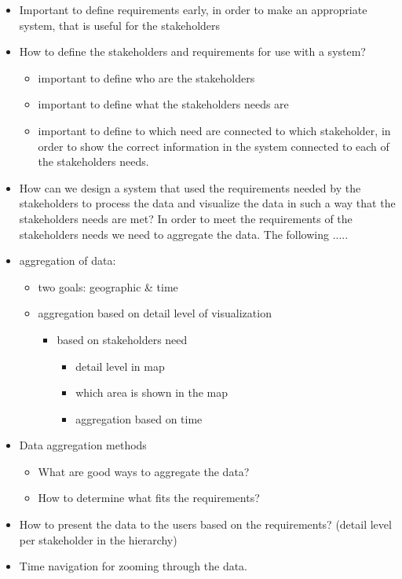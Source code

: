 \begin{itemize}
	\item Important to define requirements early, in order to make an appropriate system, that is useful for the stakeholders
	\item How to define the stakeholders and requirements for use with a system?
	\begin{itemize}
		\item important to define who are the stakeholders
		\item important to define what the stakeholders needs are
		\item important to define to which need are connected to which stakeholder, in order to show the correct information in the system connected to each of the stakeholders needs.
	\end{itemize}
	\item How can we design a system that used the requirements needed by the stakeholders to process the data and visualize the data in such a way that the stakeholders needs are met?
	In order to meet the requirements of the stakeholders needs we need to aggregate the data. The following .....
	\item aggregation of data:
	\begin{itemize}
		\item two goals: geographic \& time
		\item aggregation based on detail level of visualization
		\begin{itemize}
			\item based on stakeholders need
			\begin{itemize}
				\item detail level in map
				\item which area is shown in the map
				\item aggregation based on time
			\end{itemize}
		\end{itemize}
	\end{itemize}
	\item Data aggregation methods
	\begin{itemize}
		\item What are good ways to aggregate the data?
		\item How to determine what fits the requirements?
	\end{itemize}
	\item How to present the data to the users based on the requirements? (detail
	level per stakeholder in the hierarchy)
	\item Time navigation for zooming through the data.
\end{itemize}



